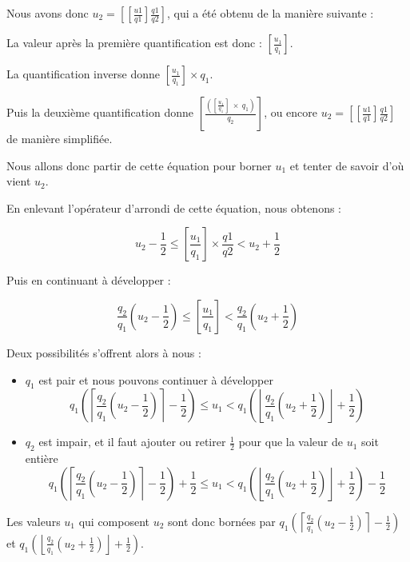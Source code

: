 \documentclass[utf8,final]{stageM2R} %
\begin{document}
Nous avons donc $u_2 = \left [ \left [ \frac{u1}{q1} \right ] \frac{q1}{q2}\right ]$, qui a été obtenu de la manière suivante : 

La valeur après la première quantification est donc : $\left [ \frac{u_1}{q_1} \right ]$.

La quantification inverse donne $\left [ \frac{u_1}{q_1} \right ] \times  q_1$.

Puis la deuxième quantification donne $\left [ \frac{\left (  \left [ \frac{u_1}{q_1} \right ]\ \times\  q_1 \right )}{q_2} \right ]$, ou encore $u_2 = \left [ \left [ \frac{u1}{q1} \right ] \frac{q1}{q2}\right ]$ de manière simplifiée.

 Nous allons donc partir de cette équation pour borner $u_1$ et tenter de savoir d'où vient $u_2$.

En enlevant l'opérateur d'arrondi de cette équation, nous obtenons : 

$$ u_2 - \frac{1}{2} \leq \left [ \frac{u_1}{q_1} \right ] \times \frac{q1}{q2} < u_2 + \frac{1}{2} $$

Puis en continuant à développer : 

$$\frac{q_2}{q_1} \left (  u_2 - \frac{1}{2}\right ) \leq \left [ \frac{u_1}{q_1} \right ] < \frac{q_2}{q_1}  \left (u_2 + \frac{1}{2} \right)$$

Deux possibilités s'offrent alors à nous : 
\begin{itemize}
  \item $q_1$ est pair et nous pouvons continuer à développer
     $$q_1\left(\left \lceil \frac{q_2}{q_1} \left (  u_2 - \frac{1}{2}\right ) \right \rceil - \frac{1}{2} \right) \leq u_1 < q_1\left(\left \lfloor \frac{q_2}{q_1} \left (  u_2 + \frac{1}{2}\right ) \right \rfloor + \frac{1}{2} \right)$$

   \item $q_2$ est impair, et il faut ajouter ou retirer $\frac{1}{2}$ pour que la valeur de $u_1$ soit entière
       $$q_1\left(\left \lceil \frac{q_2}{q_1} \left (  u_2 - \frac{1}{2}\right ) \right \rceil - \frac{1}{2} \right) + \frac{1}{2} \leq u_1 < q_1\left(\left \lfloor \frac{q_2}{q_1} \left (  u_2 + \frac{1}{2}\right ) \right \rfloor + \frac{1}{2} \right) - \frac{1}{2}$$

\end{itemize}

Les valeurs $u_1$ qui composent $u_2$ sont donc bornées par $q_1\left(\left \lceil \frac{q_2}{q_1} \left (  u_2 - \frac{1}{2}\right ) \right \rceil - \frac{1}{2} \right)$ et $q_1\left(\left \lfloor \frac{q_2}{q_1} \left (  u_2 + \frac{1}{2}\right ) \right \rfloor + \frac{1}{2} \right)$. 
\end{document}

